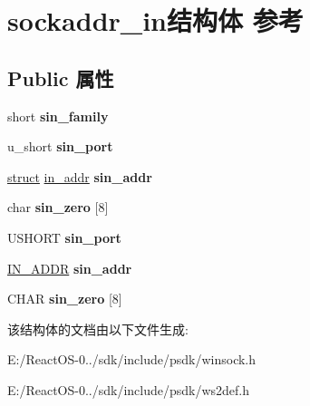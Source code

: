 \hypertarget{structsockaddr__in}{}\section{sockaddr\+\_\+in结构体 参考}
\label{structsockaddr__in}
\subsection*{Public 属性}
\begin{DoxyCompactItemize}
\item 
\mbox{\label{structsockaddr__in_a6c73a2051311c75c122d93fefa8d0183}} 
short {\bfseries sin\+\_\+family}
\item 
\mbox{\label{structsockaddr__in_aeaf80cde457c479d51c4aaa887ca3140}} 
u\+\_\+short {\bfseries sin\+\_\+port}
\item 
\mbox{\label{structsockaddr__in_a4ea5f2f1138e5c8597097db255a9ec6c}} 
\hyperlink{interfacestruct}{struct} \hyperlink{structin__addr}{in\+\_\+addr} {\bfseries sin\+\_\+addr}
\item 
\mbox{\label{structsockaddr__in_a0254bfac1c18e922cb6638c3f6139e09}} 
char {\bfseries sin\+\_\+zero} \mbox{[}8\mbox{]}
\item 
\mbox{\label{structsockaddr__in_a301f35d48deeda470636ba5b4cc95545}} 
U\+S\+H\+O\+RT {\bfseries sin\+\_\+port}
\item 
\mbox{\label{structsockaddr__in_a67d568714eab05b7cd0d22ae7f2b0b41}} 
\hyperlink{structin__addr}{I\+N\+\_\+\+A\+D\+DR} {\bfseries sin\+\_\+addr}
\item 
\mbox{\label{structsockaddr__in_a0d95ed65337828e5607762a2dec977d2}} 
C\+H\+AR {\bfseries sin\+\_\+zero} \mbox{[}8\mbox{]}
\end{DoxyCompactItemize}


该结构体的文档由以下文件生成\+:\begin{DoxyCompactItemize}
\item 
E\+:/\+React\+O\+S-\/0../sdk/include/psdk/winsock.\+h\item 
E\+:/\+React\+O\+S-\/0../sdk/include/psdk/ws2def.\+h\end{DoxyCompactItemize}

